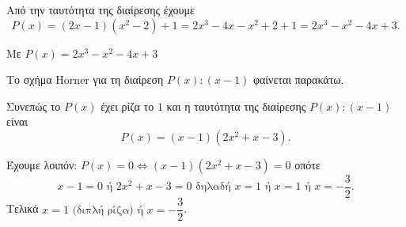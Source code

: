 \begin{alist}
\item Από την ταυτότητα της διαίρεσης έχουμε
\[P(x) = (2x - 1)(x^2 - 2) + 1 = 2x^3 - 4x - x^2 + 2 + 1 = 2x^3 - x^2 - 4x + 3.\]
\item Με $P(x) = 2x^3 - x^2 - 4x + 3$
\begin{rlist}
\item Το σχήμα Horner για τη διαίρεση $P(x) : (x - 1)$ φαίνεται παρακάτω.
\begin{center}
\end{center}
Συνεπώς το $P(x)$ έχει ρίζα το $1$ και η ταυτότητα της διαίρεσης $P(x) : (x - 1)$ είναι
\[P(x) = (x - 1)(2x^2 + x - 3).\]
\item Έχουμε λοιπόν: $P(x) = 0 \Leftrightarrow (x - 1)(2x^2 + x - 3) = 0$ οπότε
\[x - 1 = 0 \text{ ή } 2x^2 + x - 3 = 0 \text{ δηλαδή } x = 1 \text{ ή } x = 1 \text{ ή } x = -\frac{3}{2}.\]
Τελικά $x = 1 \text{ (διπλή ρίζα) ή } x = -\dfrac{3}{2}$.
\end{rlist}
\end{alist}

